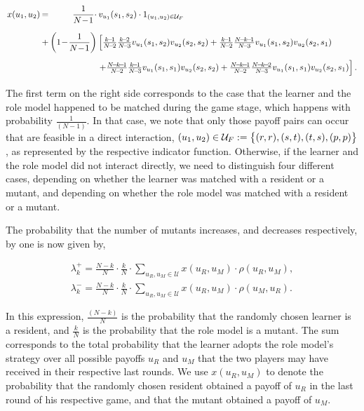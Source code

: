 \documentclass[11pt]{article}
\newcommand{\splitatcommas}[1]{%
  \begingroup
  \begingroup\lccode`~=`, \lowercase{\endgroup \edef~{\mathchar\the\mathcode`,
    \penalty0 \noexpand\hspace{0pt plus 1em}}%
  }\mathcode`,="8000 #1%
  \endgroup
}
\theoremstyle{plainCl1}
\theoremstyle{plainCl2}
\begin{document}
\begin{equation}\label{eq:Chi}
\setlength{\arraycolsep}{1pt}
\begin{array}{llrl}
x(u_1,u_2)	 &=&\displaystyle \frac{1}{N\!-\!1}\cdot  &v_{u_1}(s_1,s_2)\cdot 1_{(u_1,u_2)\in \mathcal{U}_F}\\[0.5cm]
&+	
&\displaystyle \left(1\!-\!\frac{1}{N\!-\!1}\right)  
&\left[ \frac{k\!-\!1}{N\!-\!2}\frac{k\!-\!2}{N\!-\!3} v_{u_1}(s_1,s_2) v_{u_2}(s_2,s_2) + 
 \frac{k\!-\!1}{N\!-\!2}\frac{N\!-\!k\!-\!1}{N\!-\!3} v_{u_1}(s_1,s_2) v_{u_2}(s_2,s_1)\right.\\[0.5cm]
&&&\left. +\frac{N\!-\!k\!-\!1}{N\!-\!2}\frac{k\!-\!1}{N\!-\!3} v_{u_1}(s_1,s_1) v_{u_2}(s_2,s_2) + 
 \frac{N\!-\!k\!-\!1}{N\!-\!2}\frac{N\!-\!k\!-\!2}{N\!-\!3} v_{u_1}(s_1,s_1) v_{u_2}(s_2,s_1)\right].
\end{array}
\end{equation}

The first term on the right side corresponds to the case that the learner and
the role model happened to be matched during the game stage, which happens with
probability $\frac{1}{(N\!-\!1)}$. In that case, we note that only those payoff
pairs can occur that are feasible in a direct interaction,
$\splitatcommas{(u_1,u_2)\in \mathcal{U}_F:=\big\{ (r, r), (s, t), (t, s), (p,
p) \big\}}$, as represented by the respective indicator function. Otherwise, if
the learner and the role model did not interact directly, we need to distinguish
four different cases, depending on whether the learner was matched with a
resident or a mutant, and depending on whether the role model was matched with a
resident or a mutant.

The probability that the number of mutants increases, and decreases respectively,
by one is now given by,

\begin{align}
\lambda^+_k=\frac{N\!-\!k}{N}\cdot \frac{k}{N}\cdot \sum_{u_{R},u_{M}\in\mathcal{U}} x(u_{R},u_{M})\cdot \rho(u_{R},u_{M}), \\
\lambda^-_k=\frac{N\!-\!k}{N}\cdot \frac{k}{N}\cdot \sum_{u_{R},u_{M}\in\mathcal{U}} x(u_{R},u_{M})\cdot \rho(u_{M},u_{R}).
\end{align}

In this expression, $\frac{(N\!-\!k)}{N}$ is the probability that the randomly
chosen learner is a resident, and $\frac{k}{N}$ is the probability that the role
model is a mutant. The sum corresponds to the total probability that the learner
adopts the role model's strategy over all possible payoffs $u_R$ and $u_M$ that
the two players may have received in their respective last rounds. We use
$x(u_R,u_M)$ to denote the probability that the randomly chosen resident
obtained a payoff of $u_R$ in the last round of his respective game, and that
the mutant obtained a payoff of $u_M$.
\end{document}

